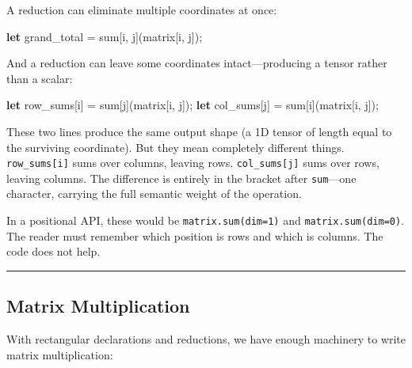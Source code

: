 \documentclass[11pt,]{article}
\newenvironment{Shaded}{}{}
\newcommand{\KeywordTok}[1]{\textcolor[rgb]{0.00,0.44,0.13}{\textbf{#1}}}
\newcommand{\NormalTok}[1]{#1}
\newcommand{\OperatorTok}[1]{\textcolor[rgb]{0.40,0.40,0.40}{#1}}
\begin{document}
A reduction can eliminate multiple coordinates at once:

\begin{Shaded}
\begin{Highlighting}[]
\KeywordTok{let}\NormalTok{ grand_total = sum}\OperatorTok{[}\NormalTok{i, j}\OperatorTok{]}\NormalTok{(matrix}\OperatorTok{[}\NormalTok{i, j}\OperatorTok{]}\NormalTok{);}
\end{Highlighting}
\end{Shaded}

And a reduction can leave some coordinates intact---producing a tensor
rather than a scalar:

\begin{Shaded}
\begin{Highlighting}[]
\KeywordTok{let}\NormalTok{ row_sums}\OperatorTok{[}\NormalTok{i}\OperatorTok{]}\NormalTok{ = sum}\OperatorTok{[}\NormalTok{j}\OperatorTok{]}\NormalTok{(matrix}\OperatorTok{[}\NormalTok{i, j}\OperatorTok{]}\NormalTok{);}
\KeywordTok{let}\NormalTok{ col_sums}\OperatorTok{[}\NormalTok{j}\OperatorTok{]}\NormalTok{ = sum}\OperatorTok{[}\NormalTok{i}\OperatorTok{]}\NormalTok{(matrix}\OperatorTok{[}\NormalTok{i, j}\OperatorTok{]}\NormalTok{);}
\end{Highlighting}
\end{Shaded}

These two lines produce the same output shape (a 1D tensor of length
equal to the surviving coordinate). But they mean completely different
things. \texttt{row\_sums{[}i{]}} sums over columns, leaving rows.
\texttt{col\_sums{[}j{]}} sums over rows, leaving columns. The
difference is entirely in the bracket after \texttt{sum}---one
character, carrying the full semantic weight of the operation.

In a positional API, these would be \texttt{matrix.sum(dim=1)} and
\texttt{matrix.sum(dim=0)}. The reader must remember which position is
rows and which is columns. The code does not help.

\begin{center}\rule{0.5\linewidth}{0.4pt}\end{center}

\hypertarget{matrix-multiplication}{%
\subsection{Matrix Multiplication}\label{matrix-multiplication}}

With rectangular declarations and reductions, we have enough machinery
to write matrix multiplication:
\end{document}
